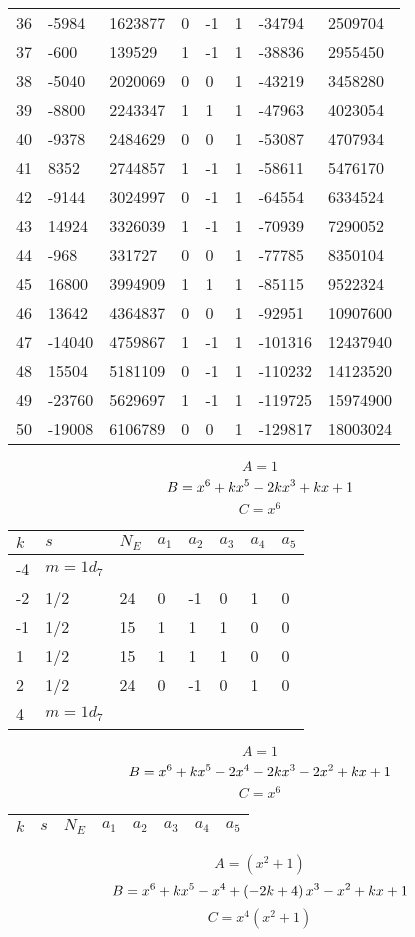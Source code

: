 \documentclass{amsart}
\begin{document}
\begin{longtable}{|l|l|l|lllll|}
36&-5984&1623877&0&-1&1&-34794&2509704\\
37&-600&139529&1&-1&1&-38836&2955450\\
38&-5040&2020069&0&0&1&-43219&3458280\\
39&-8800&2243347&1&1&1&-47963&4023054\\
40&-9378&2484629&0&0&1&-53087&4707934\\
41&8352&2744857&1&-1&1&-58611&5476170\\
42&-9144&3024997&0&-1&1&-64554&6334524\\
43&14924&3326039&1&-1&1&-70939&7290052\\
44&-968&331727&0&0&1&-77785&8350104\\
45&16800&3994909&1&1&1&-85115&9522324\\
46&13642&4364837&0&0&1&-92951&10907600\\
47&-14040&4759867&1&-1&1&-101316&12437940\\
48&15504&5181109&0&-1&1&-110232&14123520\\
49&-23760&5629697&1&-1&1&-119725&15974900\\
50&-19008&6106789&0&0&1&-129817&18003024\\
\hline
\end{longtable}
$$A=1$$
$$B=x^6
 + k\*x^5
 - 2\*k\*x^3
 + k\*x
 + 1$$
$$C=x^6$$
\begin{longtable}{|l|l|l|lllll|}
\hline
$k$ & $s$ & $N_E$ & $a_1$ & $a_2$ & $a_3$ & $a_4$ & $a_5$\\
\hline
-4&$m=1d_{7}$&&\multicolumn{5}{c|}{}\\
-2&1/2&24&0&-1&0&1&0\\
-1&1/2&15&1&1&1&0&0\\
1&1/2&15&1&1&1&0&0\\
2&1/2&24&0&-1&0&1&0\\
4&$m=1d_{7}$&&\multicolumn{5}{c|}{}\\
\hline
\end{longtable}
$$A=1$$
$$B=x^6
 + k\*x^5
 - 2\*x^4
 - 2\*k\*x^3
 - 2\*x^2
 + k\*x
 + 1$$
$$C=x^6$$
\begin{longtable}{|l|l|l|lllll|}
\hline
$k$ & $s$ & $N_E$ & $a_1$ & $a_2$ & $a_3$ & $a_4$ & $a_5$\\
\hline
\hline
\end{longtable}
$$A=(x^2
 + 1)$$
$$B=x^6
 + k\*x^5
 - x^4
 + \left(-2\*k
 + 4\right) \*x^3
 - x^2
 + k\*x
 + 1$$
$$C=x^4(x^2
 + 1)$$
\end{document}

